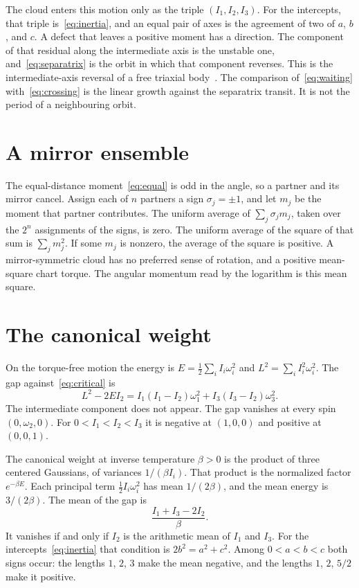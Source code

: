 \documentclass[a4paper]{article}
\begin{document}
The cloud enters this motion only as the triple \((I_1,I_2,I_3)\). For the intercepts, that triple is~\eqref{eq:inertia}, and an equal pair of axes is the agreement of two of \(a\), \(b\), and \(c\). A defect that leaves a positive moment has a direction. The component of that residual along the intermediate axis is the unstable one, and~\eqref{eq:separatrix} is the orbit in which that component reverses. This is the intermediate-axis reversal of a free triaxial body~\cite{ashbaugh1991}. The comparison of~\eqref{eq:waiting} with~\eqref{eq:crossing} is the linear growth against the separatrix transit. It is not the period of a neighbouring orbit.

\section{A mirror ensemble}
\label{sec:mirror}

The equal-distance moment~\eqref{eq:equal} is odd in the angle, so a partner and its mirror cancel. Assign each of \(n\) partners a sign \(\sigma_j=\pm 1\), and let \(m_j\) be the moment that partner contributes. The uniform average of \(\sum_j\sigma_j m_j\), taken over the \(2^n\) assignments of the signs, is zero. The uniform average of the square of that sum is \(\sum_j m_j^2\). If some \(m_j\) is nonzero, the average of the square is positive. A mirror-symmetric cloud has no preferred sense of rotation, and a positive mean-square chart torque. The angular momentum read by the logarithm is this mean square.

\section{The canonical weight}
\label{sec:canonical}

On the torque-free motion the energy is \(E=\tfrac12\sum_i I_i\omega_i^2\) and \(L^2=\sum_i I_i^2\omega_i^2\). The gap against~\eqref{eq:critical} is
\begin{equation}
\label{eq:gap}
L^2-2EI_2=I_1(I_1-I_2)\omega_1^2+I_3(I_3-I_2)\omega_3^2.
\end{equation}
The intermediate component does not appear. The gap vanishes at every spin \((0,\omega_2,0)\). For \(0<I_1<I_2<I_3\) it is negative at \((1,0,0)\) and positive at \((0,0,1)\).

The canonical weight at inverse temperature \(\beta>0\) is the product of three centered Gaussians, of variances \(1/(\beta I_i)\). That product is the normalized factor \(e^{-\beta E}\). Each principal term \(\tfrac12 I_i\omega_i^2\) has mean \(1/(2\beta)\), and the mean energy is \(3/(2\beta)\). The mean of the gap is
\begin{equation}
\label{eq:mean-gap}
\frac{I_1+I_3-2I_2}{\beta}.
\end{equation}
It vanishes if and only if \(I_2\) is the arithmetic mean of \(I_1\) and \(I_3\). For the intercepts~\eqref{eq:inertia} that condition is \(2b^2=a^2+c^2\). Among \(0<a<b<c\) both signs occur: the lengths \(1\), \(2\), \(3\) make the mean negative, and the lengths \(1\), \(2\), \(5/2\) make it positive.
\end{document}
